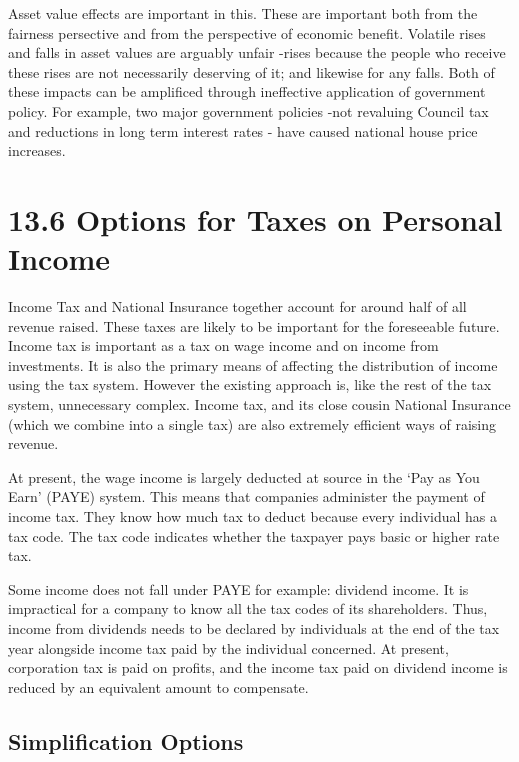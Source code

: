 \documentclass[]{tufte-handout}
\begin{document}
Asset value effects are important in this. These are important both from
the fairness persective and from the perspective of economic benefit.
Volatile rises and falls in asset values are arguably unfair -rises
because the people who receive these rises are not necessarily deserving
of it; and likewise for any falls. Both of these impacts can be
amplificed through ineffective application of government policy. For
example, two major government policies -not revaluing Council tax and
reductions in long term interest rates - have caused national house
price increases.

\hypertarget{options-for-taxes-on-personal-income}{%
\section{13.6 Options for Taxes on Personal
Income}\label{options-for-taxes-on-personal-income}}

Income Tax and National Insurance together account for around half of
all revenue raised. These taxes are likely to be important for the
foreseeable future. Income tax is important as a tax on wage income and
on income from investments. It is also the primary means of affecting
the distribution of income using the tax system. However the existing
approach is, like the rest of the tax system, unnecessary complex.
Income tax, and its close cousin National Insurance (which we combine
into a single tax) are also extremely efficient ways of raising revenue.

At present, the wage income is largely deducted at source in the `Pay as
You Earn' (PAYE) system. This means that companies administer the
payment of income tax. They know how much tax to deduct because every
individual has a tax code. The tax code indicates whether the taxpayer
pays basic or higher rate tax.

Some income does not fall under PAYE for example: dividend income. It is
impractical for a company to know all the tax codes of its shareholders.
Thus, income from dividends needs to be declared by individuals at the
end of the tax year alongside income tax paid by the individual
concerned. At present, corporation tax is paid on profits, and the
income tax paid on dividend income is reduced by an equivalent amount to
compensate.

\hypertarget{simplification-options}{%
\subsection{Simplification Options}\label{simplification-options}}
\end{document}

